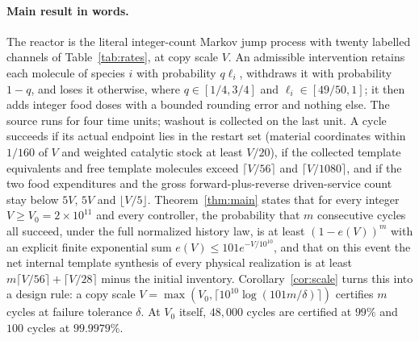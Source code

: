 \documentclass[11pt,a4paper]{article}
\theoremstyle{plain}
\theoremstyle{definition}
\theoremstyle{remark}
\begin{document}
\paragraph{Main result in words.}
The reactor is the literal integer-count Markov jump process with twenty labelled channels of Table~\ref{tab:rates}, at copy scale $V$. An admissible intervention retains each molecule of species $i$ with probability $q\ell_i$, withdraws it with probability $1-q$, and loses it otherwise, where $q\in[1/4,3/4]$ and $\ell_i\in[49/50,1]$; it then adds integer food doses with a bounded rounding error and nothing else. The source runs for four time units; washout is collected on the last unit. A cycle succeeds if its actual endpoint lies in the restart set (material coordinates within $1/160$ of $V$ and weighted catalytic stock at least $V/20$), if the collected template equivalents and free template molecules exceed $\lceil V/56\rceil$ and $\lceil V/1080\rceil$, and if the two food expenditures and the gross forward-plus-reverse driven-service count stay below $5V$, $5V$ and $\lfloor V/5\rfloor$. Theorem~\ref{thm:main} states that for every integer $V\ge V_0=2\times10^{11}$ and every controller, the probability that $m$ consecutive cycles all succeed, under the full normalized history law, is at least $(1-e(V))^m$ with an explicit finite exponential sum $e(V)\le101e^{-V/10^{10}}$, and that on this event the net internal template synthesis of every physical realization is at least $m\lceil V/56\rceil+\lceil V/28\rceil$ minus the initial inventory. Corollary~\ref{cor:scale} turns this into a design rule: a copy scale $V=\max(V_0,\lceil10^{10}\log(101m/\delta)\rceil)$ certifies $m$ cycles at failure tolerance $\delta$. At $V_0$ itself, $48{,}000$ cycles are certified at $99\%$ and $100$ cycles at $99.9979\%$.
\end{document}
